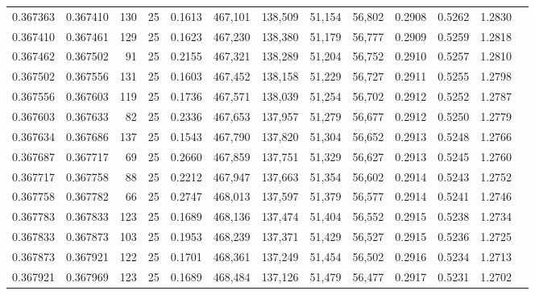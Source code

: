 \begin{tabular}{rrrrrrrrrrrrr}
0.367363 & 0.367410 &   130 &  25 &                                     0.1613 & 467,101 & 138,509 &  51,154 &  56,802 & 0.2908 & 0.5262 & 1.2830 \\
0.367410 & 0.367461 &   129 &  25 &                                     0.1623 & 467,230 & 138,380 &  51,179 &  56,777 & 0.2909 & 0.5259 & 1.2818 \\
0.367462 & 0.367502 &    91 &  25 &                                     0.2155 & 467,321 & 138,289 &  51,204 &  56,752 & 0.2910 & 0.5257 & 1.2810 \\
0.367502 & 0.367556 &   131 &  25 &                                     0.1603 & 467,452 & 138,158 &  51,229 &  56,727 & 0.2911 & 0.5255 & 1.2798 \\
0.367556 & 0.367603 &   119 &  25 &                                     0.1736 & 467,571 & 138,039 &  51,254 &  56,702 & 0.2912 & 0.5252 & 1.2787 \\
0.367603 & 0.367633 &    82 &  25 &                                     0.2336 & 467,653 & 137,957 &  51,279 &  56,677 & 0.2912 & 0.5250 & 1.2779 \\
0.367634 & 0.367686 &   137 &  25 &                                     0.1543 & 467,790 & 137,820 &  51,304 &  56,652 & 0.2913 & 0.5248 & 1.2766 \\
0.367687 & 0.367717 &    69 &  25 &                                     0.2660 & 467,859 & 137,751 &  51,329 &  56,627 & 0.2913 & 0.5245 & 1.2760 \\
0.367717 & 0.367758 &    88 &  25 &                                     0.2212 & 467,947 & 137,663 &  51,354 &  56,602 & 0.2914 & 0.5243 & 1.2752 \\
0.367758 & 0.367782 &    66 &  25 &                                     0.2747 & 468,013 & 137,597 &  51,379 &  56,577 & 0.2914 & 0.5241 & 1.2746 \\
0.367783 & 0.367833 &   123 &  25 &                                     0.1689 & 468,136 & 137,474 &  51,404 &  56,552 & 0.2915 & 0.5238 & 1.2734 \\
0.367833 & 0.367873 &   103 &  25 &                                     0.1953 & 468,239 & 137,371 &  51,429 &  56,527 & 0.2915 & 0.5236 & 1.2725 \\
0.367873 & 0.367921 &   122 &  25 &                                     0.1701 & 468,361 & 137,249 &  51,454 &  56,502 & 0.2916 & 0.5234 & 1.2713 \\
0.367921 & 0.367969 &   123 &  25 &                                     0.1689 & 468,484 & 137,126 &  51,479 &  56,477 & 0.2917 & 0.5231 & 1.2702 \\

\end{tabular}
